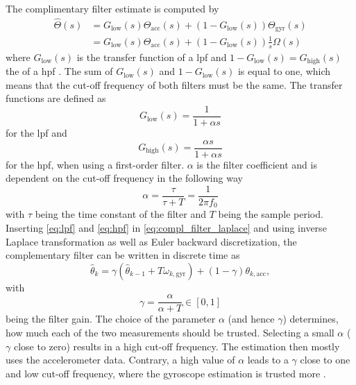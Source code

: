 The complimentary filter estimate is computed by
\begin{align}
	\label{eq:compl_filter_laplace}
	\hat{\Theta}(s) & = G_\mathrm{low}(s)\Theta_\mathrm{acc}(s) + (1 - G_\mathrm{low}(s))\Theta_\mathrm{gyr}(s) \nonumber \\
	                & = G_\mathrm{low}(s)\Theta_\mathrm{acc}(s) + (1 - G_\mathrm{low}(s))\frac{1}{s}\Omega (s)
\end{align}
where $G_\mathrm{low}(s)$ is the transfer function of a \gls{lpf} and $1-G_\mathrm{low}(s) = G_\mathrm{high}(s)$ the of a \gls{hpf} \cite{Kok2017}.
The sum of $G_\mathrm{low}(s)$ and $1-G_\mathrm{low}(s)$ is equal to one, which means that the cut-off frequency of both filters must be the same.
The transfer functions are defined as
\begin{equation}
	\label{eq:lpf}
	G_\mathrm{low} (s) = \frac{1}{1 + \alpha s}
\end{equation}
for the \gls{lpf} and
\begin{equation}
	\label{eq:hpf}
	G_\mathrm{high} (s) = \frac{\alpha s}{1 + \alpha s}
\end{equation}
for the \gls{hpf}, when using a first-order filter.
$\alpha$ is the filter coefficient and is dependent on the cut-off frequency in the following way
\begin{equation}
	\alpha
	= \frac{\tau}{\tau + T}
	= \frac{1}{2\pi f_0}
	\label{eq:filter_f0}
\end{equation}
with $\tau$ being the time constant of the filter and $T$ being the sample period.
Inserting \cref{eq:lpf} and \cref{eq:hpf} in \cref{eq:compl_filter_laplace} and using inverse Laplace transformation as well as Euler backward discretization, the complementary filter can be written in discrete time as
\begin{equation}
	\hat{\theta}_k = \gamma\left(\hat{\theta}_{k - 1} + T \omega_{k, \mathrm{gyr}}\right) + (1 - \gamma) \theta_{k, \mathrm{acc}},
\end{equation}
with
\begin{equation}
	\label{eq:filter_gain}
	\gamma = \frac{\alpha}{\alpha + T} \in [0,1]
\end{equation}
being the filter gain.
The choice of the parameter $\alpha$ (and hence $\gamma$) determines, how much each of the two measurements should be trusted.
Selecting a small $\alpha$ ($\gamma$ close to zero) results in a high cut-off frequency.
The estimation then mostly uses the accelerometer data.
Contrary, a high value of $\alpha$ leads to a $\gamma$ close to one and low cut-off frequency, where the gyroscope estimation is trusted more \cite{1997Baerveldt}.\par
